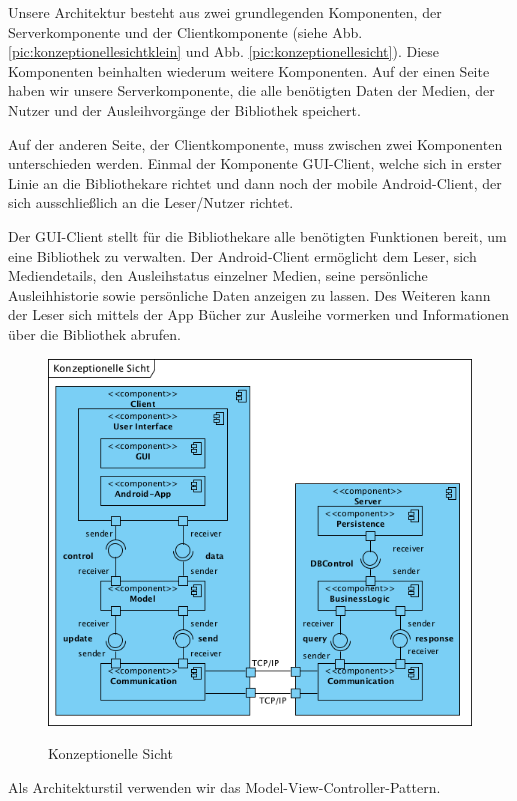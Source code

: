 \documentclass[fontsize=12pt,paper=a4,twoside]{scrartcl}
\begin{document}
Unsere Architektur besteht aus zwei grundlegenden Komponenten, der Serverkomponente und der Clientkomponente (siehe Abb. \vref{pic:konzeptionellesichtklein} und Abb. \vref{pic:konzeptionellesicht}). Diese Komponenten beinhalten wiederum weitere Komponenten. Auf der einen Seite haben wir unsere Serverkomponente, die alle benötigten Daten der Medien, der Nutzer und der Ausleihvorgänge der Bibliothek speichert.

Auf der anderen Seite, der Clientkomponente, muss zwischen zwei Komponenten unterschieden werden. Einmal der Komponente GUI-Client, welche sich in erster Linie an die Bibliothekare richtet und dann noch der mobile Android-Client, der sich ausschließlich an die Leser/Nutzer richtet.

Der GUI-Client stellt für die Bibliothekare alle benötigten Funktionen bereit, um eine Bibliothek zu verwalten. Der Android-Client ermöglicht dem Leser, sich Mediendetails, den Ausleihstatus einzelner Medien, seine persönliche Ausleihhistorie sowie persönliche Daten anzeigen zu lassen. Des Weiteren kann der Leser sich mittels der App Bücher zur Ausleihe vormerken und Informationen über die Bibliothek abrufen.

\begin{figure} [H] 
\caption{Konzeptionelle Sicht}  \centering
	\includegraphics[width=1\textwidth]{Diagramme/KonzeptionelleSicht.png} 
	\label{pic:konzeptionellesicht} 
\end{figure}

{\centering Als Architekturstil verwenden wir das Model-View-Controller-Pattern.\\}
\end{document}
